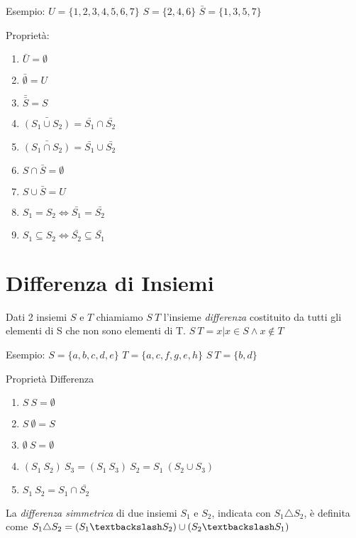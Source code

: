 Esempio: \newline
$U = \{1,2,3,4,5,6,7\} $\newline
$S = \{2,4,6\} $ \newline
$\bar{S} = \{1,3,5,7\} $

Proprietà:
\begin{enumerate}
  \item $\bar{U} = \emptyset $
  \item $\bar{\emptyset} = U$
  \item $\bar{\bar{S}} = S$
  \item $\bar{(S_1 \cup S_2)} = \bar{S_1} \cap \bar{S_2}$
  \item $\bar{(S_1 \cap S_2)} = \bar{S_1} \cup \bar{S_2}$
  \item $S \cap \bar{S} = \emptyset$
  \item $S \cup \bar{S} = U$
  \item $S_1 = S_2 \iff \bar{S_1} = \bar{S_2}$
  \item $S_1 \subseteq S_2 \iff \bar{S_2} \subseteq \bar{S_1}$
\end{enumerate}

\section{Differenza di Insiemi}
Dati 2 insiemi $S$ e $T$ chiamiamo $S \ T$ l'insieme \textit{differenza} costituito
da tutti gli elementi di S che non sono elementi di T. \newline
$S \ T = {x | x \in S \land x \not \in T} $

Esempio: \newline
$S = \{a,b,c,d,e\}$ \quad $T = \{a,c,f,g,e,h\}$\newline
$S \ T = \{b,d\}$

Proprietà Differenza
\begin{enumerate}
  \item $S \ S = \emptyset$
  \item $S \ \emptyset = S$
  \item $\emptyset \ S = \emptyset$
  \item $(S_1 \ S_2) \ S_3 = (S_1 \ S_3) \ S_2 = S_1 \ (S_2 \cup S_3)$
  \item $S_1 \ S_2 = S_1 \cap \bar{S_2}$
\end{enumerate}

La \textit{differenza simmetrica} di due insiemi $S_1$ e $S_2$, indicata con $S_1 \triangle S_2$,
è definita come $S_1 \triangle S_2 = (S_1 \textbackslash S_2) \cup (S_2 \textbackslash S_1) $

